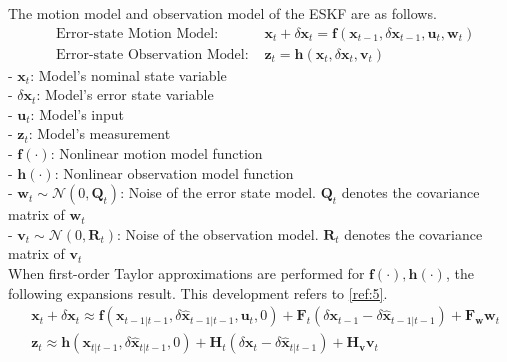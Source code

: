 \documentclass[10pt]{article}
\begin{document}
	The motion model and observation model of the ESKF are as follows.
	\begin{equation}
		\begin{aligned}
			& \text{Error-state Motion Model: } & \mathbf{x}_{t} + \delta \mathbf{x}_{t} = \mathbf{f}(\mathbf{x}_{t-1}, \delta \mathbf{x}_{t-1},\mathbf{u}_{t}, \mathbf{w}_{t})  \\  
			& \text{Error-state Observation Model: } &  \mathbf{z}_{t} = \mathbf{h}(\mathbf{x}_{t}, \delta \mathbf{x}_{t}, \mathbf{v}_{t})
		\end{aligned}
	\end{equation}
	- $\mathbf{x}_{t}$: Model's nominal state variable\\
	- $\delta \mathbf{x}_{t}$: Model's error state variable\\
	- $\mathbf{u}_{t}$: Model's input\\
	- $\mathbf{z}_{t}$: Model's measurement\\
	- $\mathbf{f}(\cdot)$: Nonlinear motion model function\\
	- $\mathbf{h}(\cdot)$: Nonlinear observation model function\\
	- $\mathbf{w}_{t} \sim \mathcal{N}(0, \mathbf{Q}_{t})$: Noise of the error state model. $\mathbf{Q}_{t}$ denotes the covariance matrix of $\mathbf{w}_{t}$\\
	- $\mathbf{v}_{t} \sim \mathcal{N}(0, \mathbf{R}_{t})$: Noise of the observation model. $\mathbf{R}_{t}$ denotes the covariance matrix of $\mathbf{v}_{t}$\\
	
	When first-order Taylor approximations are performed for $\mathbf{f}(\cdot), \mathbf{h}(\cdot)$, the following expansions result. This development refers to \ref{ref:5}.
	\begin{equation} \label{eq:33}
		\begin{aligned} 
			& \mathbf{x}_{t} + \delta \mathbf{x}_{t} \approx \mathbf{f} ( \mathbf{x}_{t-1|t-1}, \delta \hat{\mathbf{x}}_{t-1|t-1},\mathbf{u}_{t}, 0) + \mathbf{F}_{t}(\delta  \mathbf{x}_{t-1} - \delta 
			\hat{\mathbf{x}}_{t-1|t-1}) + \mathbf{F}_{\mathbf{w}} \mathbf{w}_{t} \\
			&  \mathbf{z}_{t} \approx \mathbf{h}( 
			\mathbf{x}_{t|t-1}, \delta \hat{\mathbf{x}}_{t|t-1}, 0) + \mathbf{H}_{t}(\delta \mathbf{x}_{t} - \delta \hat{\mathbf{x}}_{t|t-1}) + \mathbf{H}_{\mathbf{v}} \mathbf{v}_{t}
		\end{aligned} 
	\end{equation}
	
\end{document}
